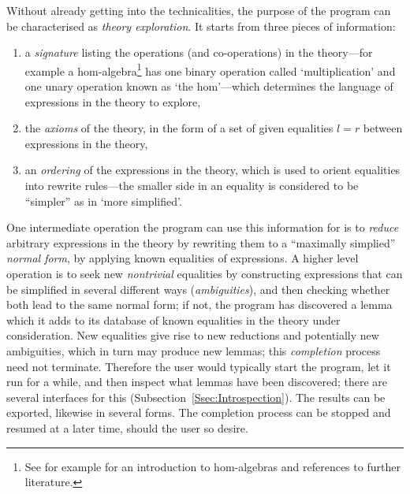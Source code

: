 \documentclass{article}
\theoremstyle{definition}
\begin{document}
Without already getting into the technicalities, the purpose of the 
program can be characterised as \emph{theory exploration}. It starts 
from three pieces of information:
\begin{enumerate}
  \item
    a \emph{signature} listing the operations (and co-operations) in 
    the theory---for example a hom-algebra\footnote{
      See for example \cite{HMS} for an introduction to hom-algebras 
      and references to further literature.
    } has one binary operation 
    called `multiplication' and one unary operation known as `the 
    hom'---which determines the language of expressions in the theory 
    to explore,
  \item
    the \emph{axioms} of the theory, in the form of a set of given 
    equalities \(l = r\) between expressions in the theory,
  \item
    an \emph{ordering} of the expressions in the theory, which is 
    used to orient equalities into rewrite rules---the smaller side 
    in an equality is considered to be ``simpler'' as in `more 
    simplified'.
\end{enumerate}
One intermediate operation the program can use this information for 
is to \emph{reduce} arbitrary expressions in the theory by rewriting 
them to a ``maximally simplied'' \emph{normal form}, by applying 
known equalities of expressions. A higher level operation is to seek 
new \emph{nontrivial} equalities by constructing expressions that can 
be simplified in several different ways (\emph{ambiguities}), and then 
checking whether both lead to the same normal form; if not, the 
program has discovered a lemma which it adds to its database of known 
equalities in the theory under consideration. New equalities give 
rise to new reductions and potentially new ambiguities, which in turn 
may produce new lemmas; this \emph{completion} process need not 
terminate. Therefore the user would typically start the program, let 
it run for a while, and then inspect what lemmas have been 
discovered; there are several interfaces for this 
(Subsection~\ref{Ssec:Introspection}). The results can be 
exported, likewise in several forms. The completion process can 
be stopped and resumed at a later time, should the user so desire.
\end{document}
